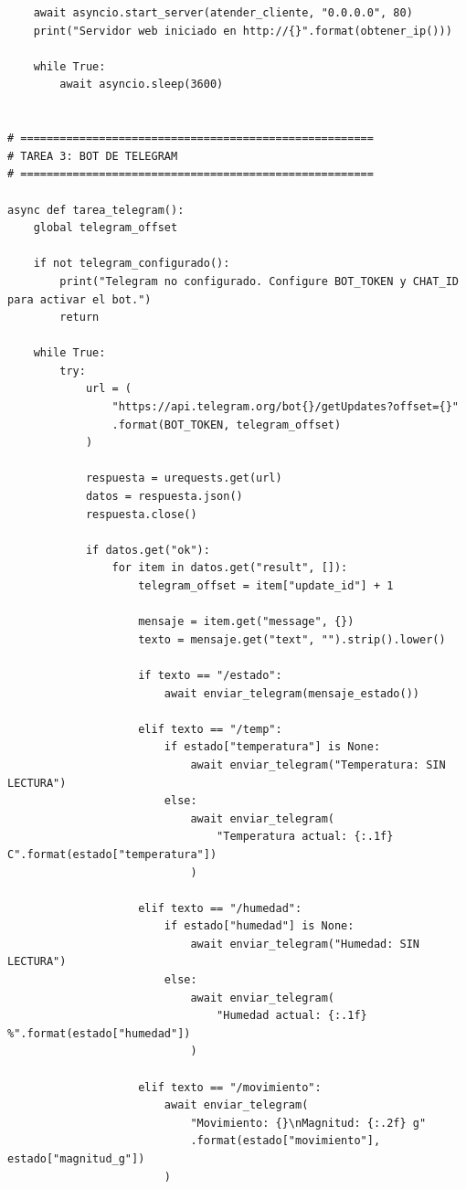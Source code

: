 \documentclass[12pt]{article}
\begin{document}
\begin{lstlisting}
    await asyncio.start_server(atender_cliente, "0.0.0.0", 80)
    print("Servidor web iniciado en http://{}".format(obtener_ip()))

    while True:
        await asyncio.sleep(3600)


# ======================================================
# TAREA 3: BOT DE TELEGRAM
# ======================================================

async def tarea_telegram():
    global telegram_offset

    if not telegram_configurado():
        print("Telegram no configurado. Configure BOT_TOKEN y CHAT_ID para activar el bot.")
        return

    while True:
        try:
            url = (
                "https://api.telegram.org/bot{}/getUpdates?offset={}"
                .format(BOT_TOKEN, telegram_offset)
            )

            respuesta = urequests.get(url)
            datos = respuesta.json()
            respuesta.close()

            if datos.get("ok"):
                for item in datos.get("result", []):
                    telegram_offset = item["update_id"] + 1

                    mensaje = item.get("message", {})
                    texto = mensaje.get("text", "").strip().lower()

                    if texto == "/estado":
                        await enviar_telegram(mensaje_estado())

                    elif texto == "/temp":
                        if estado["temperatura"] is None:
                            await enviar_telegram("Temperatura: SIN LECTURA")
                        else:
                            await enviar_telegram(
                                "Temperatura actual: {:.1f} C".format(estado["temperatura"])
                            )

                    elif texto == "/humedad":
                        if estado["humedad"] is None:
                            await enviar_telegram("Humedad: SIN LECTURA")
                        else:
                            await enviar_telegram(
                                "Humedad actual: {:.1f} %".format(estado["humedad"])
                            )

                    elif texto == "/movimiento":
                        await enviar_telegram(
                            "Movimiento: {}\nMagnitud: {:.2f} g"
                            .format(estado["movimiento"], estado["magnitud_g"])
                        )


\end{lstlisting}
\end{document}
